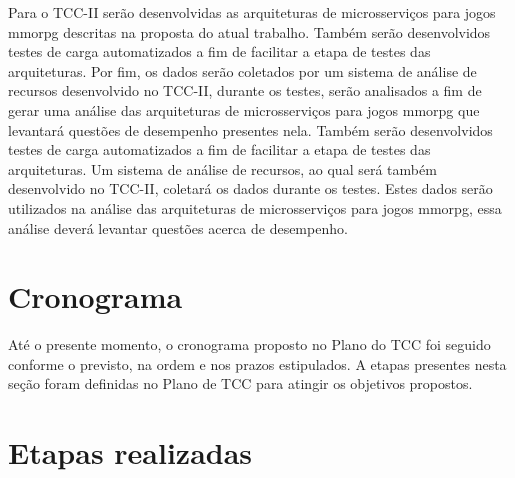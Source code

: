 Para o TCC-II serão desenvolvidas as arquiteturas de microsserviços para jogos \ac{mmorpg} descritas na proposta do atual trabalho.
%
Também serão desenvolvidos testes de carga automatizados a fim de facilitar a etapa de testes das arquiteturas.
%
Por fim, os dados serão coletados por um sistema de análise de recursos desenvolvido no TCC-II, durante os testes, serão analisados a fim de gerar uma análise das arquiteturas de microsserviços para jogos \ac{mmorpg} que levantará questões de desempenho presentes nela.
%
Também serão desenvolvidos testes de carga automatizados a fim de facilitar a etapa de testes das arquiteturas.
%
Um sistema de análise de recursos, ao qual será também desenvolvido no TCC-II, coletará os dados durante os testes. Estes dados serão utilizados na análise das arquiteturas de microsserviços para jogos \ac{mmorpg}, essa análise deverá levantar questões acerca de desempenho.


\section{Cronograma}



Até o presente momento, o cronograma proposto no Plano do TCC foi seguido conforme o previsto, na ordem e nos prazos estipulados.
%
A etapas presentes nesta seção foram definidas no Plano de TCC para atingir os objetivos propostos.



\section{Etapas realizadas}



